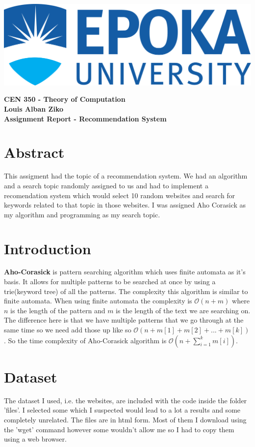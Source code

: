 \documentclass[]{article}
\newcommand\tab[1][1cm]{\hspace*{#1}}
\begin{document}
\includegraphics[scale=0.1]{res/epoka.png}
\begin{center}
	\begin{large}
		\textbf{
		CEN 350 - Theory of Computation\\
		Louis Alban Ziko\\
		Assignment Report - Recommendation System\\
		}
	\end{large}
\end{center}
\section{Abstract}
\tab This assigment had the topic of a recommendation system. 
We had an algorithm and a search topic randomly assigned to us and had to implement
a recomendation system which would select 10 random websites and search
for keywords related to that topic in those websites. I was assigned Aho Corasick
as my algorithm and programming as my search topic.

\section{Introduction}
\tab \textbf{Aho-Corasick}
is pattern searching algorithm which uses finite automata as it's basis.
It allows for multiple patterns to be searched at once by using a trie(keyword tree)
of all the patterns.
The complexity this algorithm is similar to finite automata. When using 
finite automata the complexity is $\mathcal{O}(n+m)$ where $n$ is the length of the
pattern and $m$ is the length of the text we are searching on. The difference
here is that we have multiple patterns that we go through at the same time so
we need add those up like so $\mathcal{O}(n+m[1]+m[2]+...+m[k])$. So the time
complexity of Aho-Corasick algorithm is $\mathcal{O}(n+\sum_{i=1}^{k} m[i])$.

\section{Dataset}
\tab The dataset I used, i.e. the websites, are included with the code inside the folder
'files'. I selected some which I suspected would lead to a lot a results and some
completely unrelated. The files are in html form. Most of them I download using the 
'wget' command however some wouldn't allow me so I had to copy them using a web browser.
\end{document}
